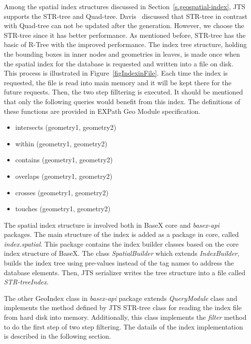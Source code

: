 \documentclass[a4paper,12pt]{article}
\begin{document}
Among the spatial index structures discussed in Section~\ref{s.geospatial-index}, JTS supports the STR-tree and Quad-tree. Davis~\cite{jts-presentation} discussed that STR-tree in contrast with Quad-tree can not be updated after the generation. However, we choose the STR-tree since it has better performance. As mentioned before, STR-tree has the basic of R-Tree with the improved performance. The index tree structure, holding the bounding boxes in inner nodes and geometries in leaves, is made once when the spatial index for the database is requested and written into a file on disk. This process is illustrated in Figure~\ref{figIndexinFile}. Each time the index is requested, the file is read 
into main memory and it will be kept there for the future requests.
Then, the two step filltering is executed. 
It should be mentioned that only the following queries would benefit from this index. The definitions of these functions are provided in EXPath Geo Module specification.
\begin{itemize}
\item intersects (geometry1, geometry2)
\item within (geometry1, geometry2)
\item contains (geometry1, geometry2)
\item overlaps (geometry1, geometry2)
\item crosses (geometry1, geometry2)
\item touches (geometry1, geometry2)
\end{itemize}

The spatial index structure is involved both in BaseX core and \textit{basex-api} packages. The main structure of the index is added as a package in core, called \textit{index.spatial}. This package contains the index builder classes based on the core index structure of BaseX. The class \textit{SpatialBuilder} which extends \textit{IndexBuilder}, builds the index tree using pre-values instead of the tag names to address the database elements. Then, JTS serializer writes the tree structure into a file called \textit{STR-treeIndex}.

The other GeoIndex class in \textit{basex-api} package extends \textit{QueryModule} class and implements the method defined by JTS STR-tree class for reading the index file from hard disk into memory. Additionally, this class implements the \textit{filter} method to do the first step of two step filtering. The datails of the index implementation is described in the following section.
 
\end{document}
